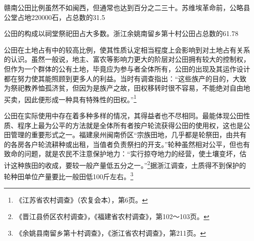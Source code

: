 赣南公田比例虽然不如闽西，但通常也达到百分之二三十。苏维埃革命前，公略县公堂占地220000石，占总数的31.5%


公田的构成以祠堂祭祀田占大多数。浙江余姚南留乡第十村公田占总数的61.78%


公田在土地占有中的较高比例，使其性质认定相当程度上会影响到对土地占有关系的认识。虽然一般说，地主、富农等影响力更大的阶层对公田拥有较大的控制权，但作为一个群体的公有土地，毕竟应为参与者全体所有，公田的出现及其运作设计都在努力使其能照顾到更多人的利益。当时有调查指出：“这些族产的目的，大致为祭祀教养恤孤济贫，但因为是族产之故，田权移转时很不容易，不能绝对自由地买卖，因此便形成一种具有特殊性的田权。”\footnote{《江苏省农村调查》（农复会本），第6页。}


公田在实际使用中存在着多种多样的情况，其得益者也不尽相同。最能体现公田性质、程序上最为公平的方法就是全体所有者按户轮流获得公田的使用权，这也是公田管理的重要形式之一。福建泉州闽南侨区“宗族田地，几乎都是轮祭田，由共有的各房各户轮流耕种或出租，当值者负责祭扫的开支。”轮种虽然相对公平，但也有致命的问题，就是农民不注意保护地力：“实行掠夺地力的经营，使土壤变坏，估计这种族田的收成，要较一般产量低五分之一。”\footnote{《晋江县侨区农村调查》，《福建省农村调查》，第102～103页。}据浙江调查，土质得不到保护的轮种田单位产量要比一般田低100斤左右。\footnote{《余姚县南留乡第十村调查》，《浙江省农村调查》，第211页。}


